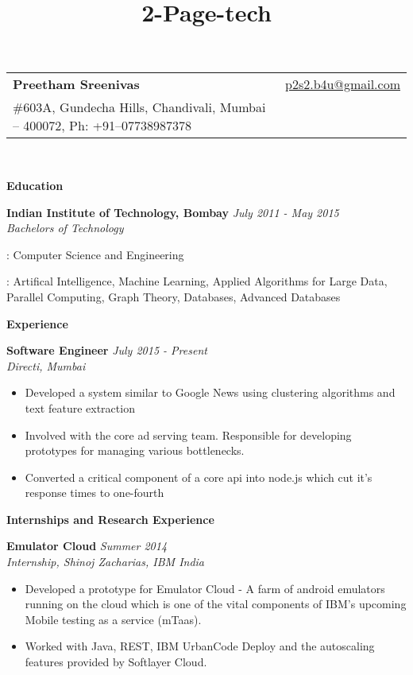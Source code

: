 \documentclass[a4paper,10pt]{article}
\title{2-Page-tech}
\newcommand{\resheading}[1]{
	{\large \colorbox{mygrey}{\begin{minipage}{\textwidth}{\textbf{#1 \vphantom{p\^{E}}}}\end{minipage}}}
}
\newcommand{\ressubheadingWithGuide}[3]{%

	\textbf{#1} \hfill \textit{#2}\null\\
	\textit{\small #3} %
	\vspace{-4pt}
}
\begin{document}
\newcommand{\mywebheader}{
\begin{tabular*}{7in}{l@{\extracolsep{\fill}}r}
	\textbf{{\LARGE Preetham Sreenivas}} & \href{mailto:p2s2.b4u@gmail.com}{p2s2.b4u@gmail.com}\\
	\#603A, Gundecha Hills, Chandivali, Mumbai -- 400072, Ph: +91--07738987378  & \\
	\end{tabular*}
\\
\vspace{0.1in}}

\mywebheader

\resheading{Education}
	\ressubheadingWithGuide{Indian Institute of Technology, Bombay}{\textit{July 2011 - May 2015}}{Bachelors of Technology}

				{ 
				\begin{description} \itemsep -1pt
					\item[Major] : Computer Science and Engineering
					\item[Key Courses] : Artifical Intelligence, Machine Learning, Applied Algorithms for Large Data, Parallel Computing, Graph Theory, Databases, Advanced Databases
				\end{description}

				}

\resheading{Experience}
	\ressubheadingWithGuide{Software Engineer}{July 2015 - Present}{Directi, Mumbai}
		\begin{itemize}\itemsep -1pt
            \item Developed a system similar to Google News using clustering algorithms and text feature extraction			
			\item  Involved with the core ad serving team. Responsible for developing prototypes for managing various bottlenecks.
			\item Converted a critical component of a core api into node.js which cut it's response times to one-fourth 
	    	\end{itemize}


\resheading{Internships and Research Experience}
	\ressubheadingWithGuide{Emulator Cloud}{Summer 2014}{Internship, Shinoj Zacharias, IBM India}
	\begin{itemize} \itemsep -1pt
		\item Developed a prototype for Emulator Cloud - A farm of android emulators running on the cloud which is one of the vital components of IBM’s upcoming Mobile testing as a service (mTaas).
		\item Worked with Java, REST, IBM UrbanCode Deploy and the autoscaling features provided by Softlayer Cloud.
	\end{itemize}
\end{document}
